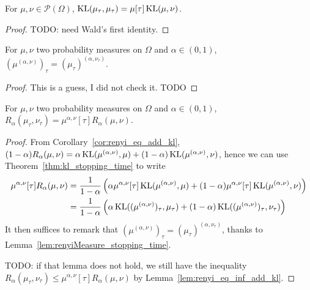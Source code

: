 \begin{theorem}
  \label{thm:kl_stopping_time}
  For $\mu, \nu \in \mathcal P(\Omega)$, $\operatorname{KL}(\mu_\tau, \mu_\tau) = \mu[\tau] \operatorname{KL}(\mu, \nu)$.
\end{theorem}

\begin{proof}
TODO: need Wald's first identity.
\end{proof}

\begin{lemma}
  \label{lem:renyiMeasure_stopping_time}
  For $\mu, \nu$ two probability measures on $\Omega$ and $\alpha \in (0,1)$, $(\mu^{(\alpha, \nu)})_\tau = (\mu_\tau)^{(\alpha, \nu_\tau)}$.
\end{lemma}

\begin{proof}
This is a guess, I did not check it. TODO
\end{proof}

\begin{theorem}
  \label{thm:renyi_stopping_time}
  For $\mu, \nu$ two probability measures on $\Omega$ and $\alpha \in (0,1)$,
  $R_\alpha(\mu_\tau, \nu_\tau) = \mu^{\alpha, \nu}[\tau] R_\alpha(\mu, \nu)$.
\end{theorem}

\begin{proof}
From Corollary~\ref{cor:renyi_eq_add_kl}, $(1 - \alpha) R_\alpha(\mu, \nu) = \alpha \operatorname{KL}(\mu^{(\alpha, \nu)}, \mu) + (1 - \alpha)\operatorname{KL}(\mu^{(\alpha, \nu)}, \nu)$, hence we can use Theorem~\ref{thm:kl_stopping_time} to write
\begin{align*}
\mu^{\alpha, \nu}[\tau] R_\alpha(\mu, \nu)
&= \frac{1}{1 - \alpha}\left(\alpha \mu^{\alpha, \nu}[\tau]\operatorname{KL}(\mu^{(\alpha, \nu)}, \mu) + (1 - \alpha)\mu^{\alpha, \nu}[\tau]\operatorname{KL}(\mu^{(\alpha, \nu)}, \nu) \right)
\\
&= \frac{1}{1 - \alpha}\left(\alpha \operatorname{KL}((\mu^{(\alpha, \nu)})_\tau, \mu_\tau) + (1 - \alpha)\operatorname{KL}((\mu^{(\alpha, \nu)})_\tau, \nu_\tau) \right)
\end{align*}
It then suffices to remark that $(\mu^{(\alpha, \nu)})_\tau = (\mu_\tau)^{(\alpha, \nu_\tau)}$, thanks to Lemma~\ref{lem:renyiMeasure_stopping_time}.

TODO: if that lemma does not hold, we still have the inequality $R_\alpha(\mu_\tau, \nu_\tau) \le \mu^{\alpha, \nu}[\tau] R_\alpha(\mu, \nu)$ by Lemma~\ref{lem:renyi_eq_inf_add_kl}.
\end{proof}
